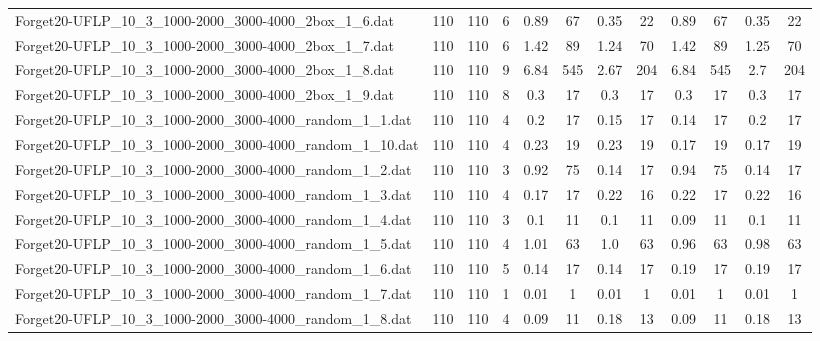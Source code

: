 \begin{sidewaystable}[!ht]
{\begin{tabular}{lccccccccccc}
Forget20-UFLP\_10\_3\_1000-2000\_3000-4000\_2box\_1\_6.dat & 110 & 110 & 6 & 0.89 & 67 &  \textcolor{blue2}{0.35} & 22 & 0.89 & 67 &  \textcolor{blue2}{0.35} & 22 \\
Forget20-UFLP\_10\_3\_1000-2000\_3000-4000\_2box\_1\_7.dat & 110 & 110 & 6 & 1.42 & 89 &  \textcolor{blue2}{1.24} & 70 & 1.42 & 89 & 1.25 & 70 \\
Forget20-UFLP\_10\_3\_1000-2000\_3000-4000\_2box\_1\_8.dat & 110 & 110 & 9 & 6.84 & 545 &  \textcolor{blue2}{2.67} & 204 & 6.84 & 545 & 2.7 & 204 \\
Forget20-UFLP\_10\_3\_1000-2000\_3000-4000\_2box\_1\_9.dat & 110 & 110 & 8 &  \textcolor{blue2}{0.3} & 17 &  \textcolor{blue2}{0.3} & 17 &  \textcolor{blue2}{0.3} & 17 &  \textcolor{blue2}{0.3} & 17 \\
Forget20-UFLP\_10\_3\_1000-2000\_3000-4000\_random\_1\_1.dat & 110 & 110 & 4 & 0.2 & 17 & 0.15 & 17 &  \textcolor{blue2}{0.14} & 17 & 0.2 & 17 \\
Forget20-UFLP\_10\_3\_1000-2000\_3000-4000\_random\_1\_10.dat & 110 & 110 & 4 & 0.23 & 19 & 0.23 & 19 &  \textcolor{blue2}{0.17} & 19 &  \textcolor{blue2}{0.17} & 19 \\
Forget20-UFLP\_10\_3\_1000-2000\_3000-4000\_random\_1\_2.dat & 110 & 110 & 3 & 0.92 & 75 &  \textcolor{blue2}{0.14} & 17 & 0.94 & 75 &  \textcolor{blue2}{0.14} & 17 \\
Forget20-UFLP\_10\_3\_1000-2000\_3000-4000\_random\_1\_3.dat & 110 & 110 & 4 &  \textcolor{blue2}{0.17} & 17 & 0.22 & 16 & 0.22 & 17 & 0.22 & 16 \\
Forget20-UFLP\_10\_3\_1000-2000\_3000-4000\_random\_1\_4.dat & 110 & 110 & 3 & 0.1 & 11 & 0.1 & 11 &  \textcolor{blue2}{0.09} & 11 & 0.1 & 11 \\
Forget20-UFLP\_10\_3\_1000-2000\_3000-4000\_random\_1\_5.dat & 110 & 110 & 4 & 1.01 & 63 & 1.0 & 63 &  \textcolor{blue2}{0.96} & 63 & 0.98 & 63 \\
Forget20-UFLP\_10\_3\_1000-2000\_3000-4000\_random\_1\_6.dat & 110 & 110 & 5 &  \textcolor{blue2}{0.14} & 17 &  \textcolor{blue2}{0.14} & 17 & 0.19 & 17 & 0.19 & 17 \\
Forget20-UFLP\_10\_3\_1000-2000\_3000-4000\_random\_1\_7.dat & 110 & 110 & 1 &  \textcolor{blue2}{0.01} & 1 &  \textcolor{blue2}{0.01} & 1 &  \textcolor{blue2}{0.01} & 1 &  \textcolor{blue2}{0.01} & 1 \\
Forget20-UFLP\_10\_3\_1000-2000\_3000-4000\_random\_1\_8.dat & 110 & 110 & 4 &  \textcolor{blue2}{0.09} & 11 & 0.18 & 13 &  \textcolor{blue2}{0.09} & 11 & 0.18 & 13 \\

\end{tabular}}
\end{sidewaystable}
